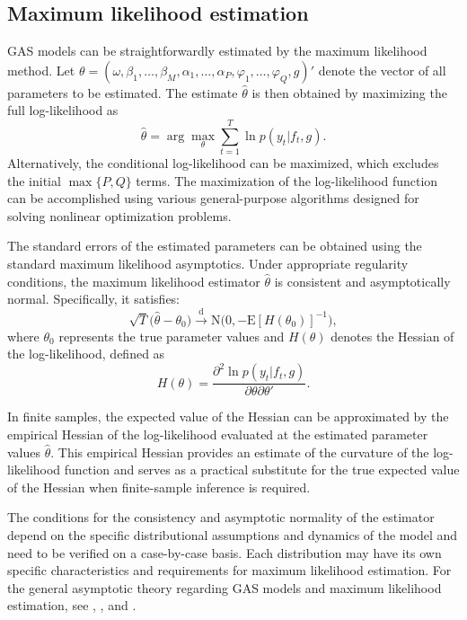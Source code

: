 \subsection{Maximum likelihood estimation}\label{maximum-likelihood-estimation}

GAS models can be straightforwardly estimated by the maximum likelihood method. Let \(\theta = (\omega, \beta_1, \ldots, \beta_M, \alpha_1, \ldots, \alpha_P, \varphi_1, \ldots, \varphi_Q, g)'\) denote the vector of all parameters to be estimated. The estimate \(\hat{\theta}\) is then obtained by maximizing the full log-likelihood as
\begin{equation}
\hat{\theta} = \arg\max_{\theta} \sum_{t=1}^T \ln p(y_t|f_t,g).
\label{eq:loglik}
\end{equation}
Alternatively, the conditional log-likelihood can be maximized, which excludes the initial \(\max\{P,Q\}\) terms. The maximization of the log-likelihood function can be accomplished using various general-purpose algorithms designed for solving nonlinear optimization problems.

The standard errors of the estimated parameters can be obtained using the standard maximum likelihood asymptotics. Under appropriate regularity conditions, the maximum likelihood estimator \(\hat{\theta}\) is consistent and asymptotically normal. Specifically, it satisfies:
\begin{equation}
\sqrt{T} \big( \hat{\theta} - \theta_0 \big) \stackrel{\mathrm{d}}{\to} \mathrm{N} \big( 0, -\mathrm{E}[H(\theta_0)]^{-1} \big), 
\label{eq:asym}
\end{equation}
where \(\theta_0\) represents the true parameter values and \(H(\theta)\) denotes the Hessian of the log-likelihood, defined as
\begin{equation}
H(\theta) = \frac{\partial^2 \ln p(y_t | f_t, g)}{\partial \theta \partial \theta'}.
\label{eq:hessian}
\end{equation}

In finite samples, the expected value of the Hessian can be approximated by the empirical Hessian of the log-likelihood evaluated at the estimated parameter values \(\hat{\theta}\). This empirical Hessian provides an estimate of the curvature of the log-likelihood function and serves as a practical substitute for the true expected value of the Hessian when finite-sample inference is required.

The conditions for the consistency and asymptotic normality of the estimator depend on the specific distributional assumptions and dynamics of the model and need to be verified on a case-by-case basis. Each distribution may have its own specific characteristics and requirements for maximum likelihood estimation. For the general asymptotic theory regarding GAS models and maximum likelihood estimation, see \citet{Blasques2014a}, \citet{Blasques2018}, and \citet{Blasques2022}.

